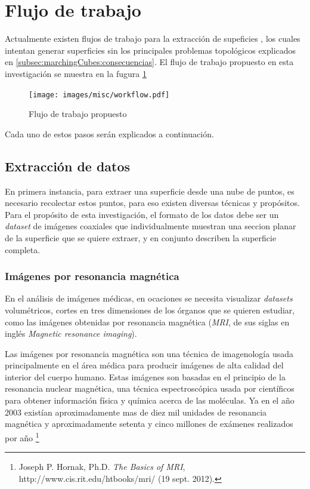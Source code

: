 \section{Flujo de trabajo}
\label{ch:propuesta:sec:flujoDeTrabajo}

Actualmente existen flujos de trabajo para la extracción de supeficies \cite{Ruprecht94ascheme}\cite{Dietrich_marchingcubes}, los cuales intentan generar superficies sin los principales problemas topológicos explicados en \ref{subsec:marchingCubes:consecuencias}. El flujo de trabajo propuesto en esta investigación se muestra en la fugura \ref{f:flujoDeTrabajo:flujoDeTrabajo}

\begin{figure}[htb]
\centering
	\texttt{[image: images/misc/workflow.pdf]}
\caption{Flujo de trabajo propuesto}
\label{f:flujoDeTrabajo:flujoDeTrabajo}
\end{figure}

Cada uno de estos pasos serán explicados a continuación.
\newpage

\subsection{Extracción de datos}
\label{ch:propuesta:sec:extraccionDeDatos}

En primera instancia, para extraer una superficie desde una nube de puntos, es necesario recolectar estos puntos, para eso existen diversas técnicas y propósitos. Para el propósito de esta investigación, el formato de los datos debe ser un \emph{dataset} de imágenes coaxiales que individualmente muestran una seccion planar de la superficie que se quiere extraer, y en conjunto describen la superficie completa.

\subsubsection{Imágenes por resonancia magnética}
\label{ch:propuesta:sec:extraccionDeDatos:subsec:imagenesPorResonanciaMagnetica}

En el análisis de imágenes médicas, en ocaciones se necesita visualizar \emph{datasets} volumétricos, cortes en tres dimensiones de los órganos que se quieren estudiar, como las imágenes obtenidas por resonancia magnética (\emph{MRI}, de sus siglas en inglés \emph{Magnetic resonance imaging}).

Las imágenes por resonancia magnética son una técnica de imagenología usada principalmente en el área médica para producir imágenes de alta calidad del interior del cuerpo humano. Estas imágenes son basadas en el principio de la resonancia nuclear magnética, una técnica espectroscópica usada por científicos para obtener información física y química acerca de las moléculas. Ya en el año 2003 existían aproximadamente mas de diez mil unidades de resonancia magnética y aproximadamente setenta y cinco millones de exámenes realizados por año \footnote{Joseph P. Hornak, Ph.D. \textit{The Basics of MRI}, http://www.cis.rit.edu/htbooks/mri/ (19 sept. 2012).}

